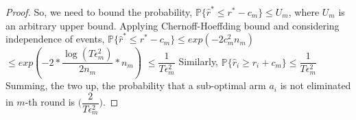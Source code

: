 \begin{proof}
	So, we need to bound the probability,
\newline\hspace*{4em} $\mathbb{P}\lbrace\hat{r}^{*}\leq r^{*} - c_{m}\rbrace\leq U_{m}$, where $U_{m}$ is an  arbitrary upper bound.
\newline
Applying Chernoff-Hoeffding bound and considering independence of events,
\newline
\newline\hspace*{0em} $\mathbb{P}\lbrace\hat{r}^{*}\leq r^{*} - c_{m}\rbrace\leq exp(-2c_{m}^{2}n_{m})$
\newline\hspace*{2em} $\leq exp(-2 * \dfrac{\log (T\epsilon_{m}^{2})}{2 n_{m}} *n_{m})$
\newline\hspace*{2em} $\leq \dfrac{1}{T\epsilon_{m}^{2}}$
\newline
Similarly, $\mathbb{P}\lbrace\hat{r}_{i}\geq r_{i} + c_{m}\rbrace\leq \dfrac{1}{T\epsilon_{m}^{2}}$
\newline
Summing, the two up, the probability that a sub-optimal arm $a_{i}$ is not eliminated in $m$-th round is  $\bigg(\dfrac{2}{T\epsilon_{m}^{2}}\bigg)$. 
\end{proof}



